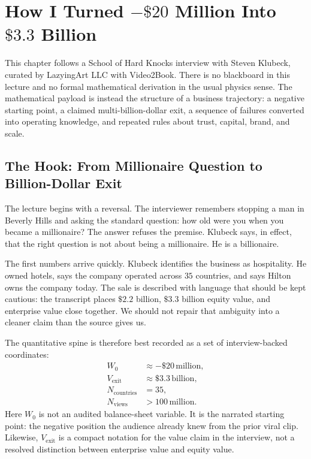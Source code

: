 \chapter{How I Turned \(-\$20\) Million Into \(\$3.3\) Billion}

This chapter follows a School of Hard Knocks interview with Steven Klubeck, curated by LazyingArt LLC with Video2Book. There is no blackboard in this lecture and no formal mathematical derivation in the usual physics sense. The mathematical payload is instead the structure of a business trajectory: a negative starting point, a claimed multi-billion-dollar exit, a sequence of failures converted into operating knowledge, and repeated rules about trust, capital, brand, and scale.

\section{The Hook: From Millionaire Question to Billion-Dollar Exit}

The lecture begins with a reversal. The interviewer remembers stopping a man in Beverly Hills and asking the standard question: how old were you when you became a millionaire? The answer refuses the premise. Klubeck says, in effect, that the right question is not about being a millionaire. He is a billionaire.

The first numbers arrive quickly. Klubeck identifies the business as hospitality. He owned hotels, says the company operated across \(35\) countries, and says Hilton owns the company today. The sale is described with language that should be kept cautious: the transcript places \(\$2.2\) billion, \(\$3.3\) billion equity value, and enterprise value close together. We should not repair that ambiguity into a cleaner claim than the source gives us.

The quantitative spine is therefore best recorded as a set of interview-backed coordinates:
\begin{align}
W_0 &\approx -\$20\,\text{million},\\
V_{\text{exit}} &\approx \$3.3\,\text{billion},\\
N_{\text{countries}} &= 35,\\
N_{\text{views}} &> 100\,\text{million}.
\end{align}
Here \(W_0\) is not an audited balance-sheet variable. It is the narrated starting point: the negative position the audience already knew from the prior viral clip. Likewise, \(V_{\text{exit}}\) is a compact notation for the value claim in the interview, not a resolved distinction between enterprise value and equity value.

